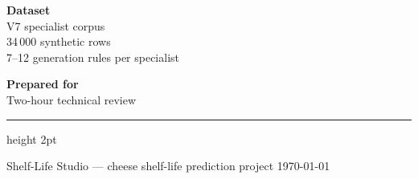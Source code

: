 \documentclass[11pt,a4paper]{report}
\begin{document}
\begin{titlepage}
\begin{minipage}{0.32\textwidth}
\medskip
\textbf{\color{burgundy}Dataset}\\
V7 specialist corpus\\
34\,000 synthetic rows\\
7--12 generation rules per specialist

\medskip
\textbf{\color{burgundy}Prepared for}\\
Two-hour technical review
\end{minipage}

\vfill
{\color{burglight}\hrule height 2pt}
\vspace{0.4cm}
{\noindent\footnotesize\color{softgrey}
Shelf-Life Studio --- cheese shelf-life prediction project \hfill \today}
\end{titlepage}

\setcounter{page}{1}



\cleardoublepage
{\hypersetup{linkcolor=ink}
\tableofcontents}
\cleardoublepage

\setcounter{page}{1}

















\appendix

\end{document}
